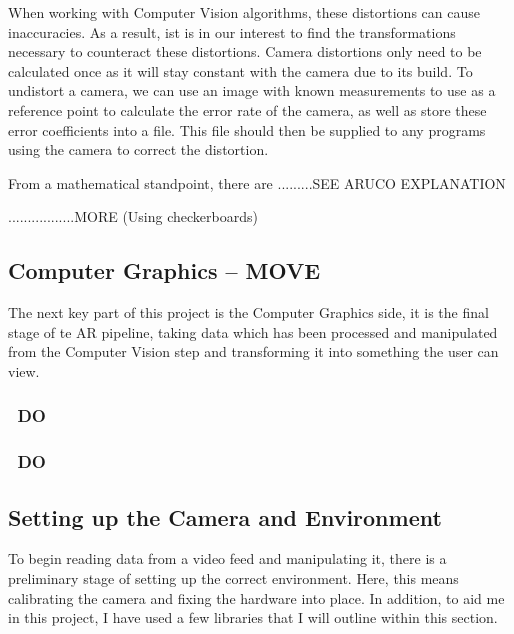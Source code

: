 \documentclass[11pt]{article}
\begin{document}
When working with Computer Vision algorithms, these distortions can cause
inaccuracies. As a result, ist is in our interest to find the transformations
necessary to counteract these distortions. Camera distortions only need to be 
calculated once as it will stay constant with the camera due to its build.
To undistort a camera, we can use an image with known measurements to use
as a reference point to calculate the error rate of the camera, as well as
store these error coefficients into a file. This file should then be supplied
to any programs using the camera to correct the distortion.

From a mathematical standpoint, there are .........SEE ARUCO EXPLANATION

.................MORE (Using checkerboards)

\subsection{Computer Graphics -- MOVE}
The next key part of this project is the Computer Graphics side, it is the
final stage of te AR pipeline, taking data which has been processed and
manipulated from the Computer Vision step and transforming it into something
the user can view.
\subsubsection{~DO~}
\subsubsection{~DO~}












\subsection{Setting up the Camera and Environment}
To begin reading data from a video feed and manipulating it, there 
is a preliminary stage of setting up the correct environment. Here,
this means calibrating the camera and fixing the hardware into place.
In addition, to aid me in this project, I have used a few libraries that
I will outline within this section.
\end{document}
